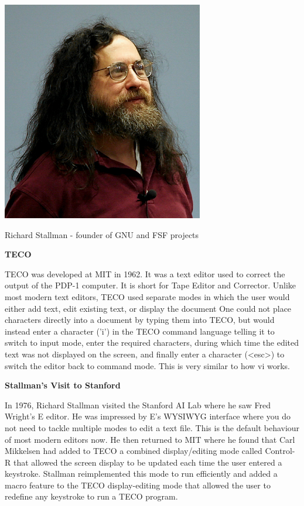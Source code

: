 \begin{marginfigure}
  \includegraphics{images/png/stallman.png}
  \caption{Richard Stallman - founder of GNU and FSF projects}
\end{marginfigure}

\textbf{TECO}

TECO was developed at MIT in 1962. It was a text editor
used to correct the output of the PDP-1 computer.
It is short for Tape Editor and Corrector.
Unlike most modern text editors,
TECO used separate modes in which the user would either
add text, edit existing text, or display the document
One could not place characters directly into a document
by typing them into TECO, but would instead enter a
character ('i') in the TECO command language telling
it to switch to input mode, enter the required characters,
during which time the edited text was not displayed on
the screen, and finally enter a character (<esc>) to
switch the editor back to command mode. This is very
similar to how vi works.

\textbf{Stallman's Visit to Stanford}

In 1976, Richard Stallman visited the Stanford AI Lab
where he saw Fred Wright's E editor. He was impressed
by E's WYSIWYG
interface where you do not need to tackle multiple
modes to edit a text file. This is the default behaviour
of most modern editors now.
He then returned to MIT where he found that
Carl Mikkelsen had added to TECO a combined
display/editing mode called Control-R that allowed
the screen display to be updated each time the user
entered a keystroke. Stallman reimplemented this mode
to run efficiently and added a macro feature to the TECO
display-editing mode that allowed the user to redefine
any keystroke to run a TECO program.

